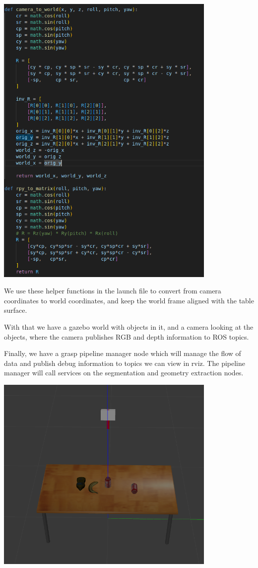 \documentclass[12pt]{article}
\begin{document}
\begin{center}
	\includegraphics[width=0.8\textwidth]{launchhelpers.png}
\end{center}

We use these helper functions in the launch file to convert from camera coordinates to world coordinates, and keep the world frame aligned with the table surface.

With that we have a gazebo world with objects in it, and a camera looking at the objects, where the camera publishes RGB and depth information to ROS topics.

Finally, we have a grasp pipeline manager node which will manage the flow of data and publish debug information to topics we can view in rviz. The pipeline manager will call services on the segmentation and geometry extraction nodes.

\begin{center}
	\includegraphics[width=0.8\textwidth]{gazebo.png}
\end{center}
\end{document}

